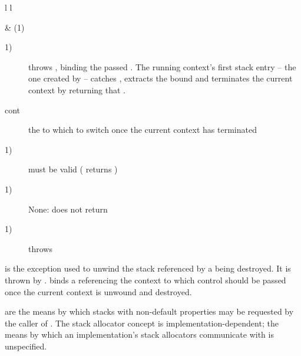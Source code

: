 \begin{tabular}{ l l }
    \midrule

     & (1)\\

    \midrule
\end{tabular}

\begin{description}
    \item[1)] throws \unwindex, binding the passed \cont. The running
              context's first stack entry -- the one created by \callcc --
              catches \unwindex, extracts the bound \cont and terminates the
              current context by returning that \cont.
\end{description}

\begin{description}
    \item[cont] the \cont to which to switch once the current context has terminated
\end{description}

\begin{description}
    \item[1)]  must be valid ( returns )
\end{description}

\begin{description}
    \item[1)] None: \unwindcont does not return
\end{description}

\begin{description}
    \item[1)] throws \unwindex
\end{description}


is the exception used to unwind the stack referenced by a \cont being
destroyed. It is thrown by \unwindcont. \unwindex binds a \cont referencing the
context to which control should be passed once the current context is unwound
and destroyed.


are the means by which stacks with non-default properties may be requested by
the caller of \callcc. The stack allocator concept is
implementation-dependent; the means by which an implementation's stack
allocators communicate with \callcc is unspecified.\\

